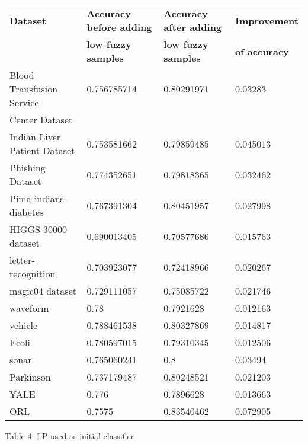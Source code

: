 \documentclass{article}
\begin{document}
		\begin{center}
			\textcolor{blue}{
				\begin{tabular}{l|l|l|l}
					\hline
					\textbf{Dataset} & \textbf{Accuracy before adding} & \textbf{Accuracy after adding} & \textbf{Improvement}\\
					& \textbf{low fuzzy samples} & \textbf{low fuzzy samples} & \textbf{of accuracy}\\
					\hline
					\hline
					Blood Transfusion Service & 0.756785714 & 0.80291971 & 0.03283 \\
					Center Dataset &  &  &  \\
					\hline
					Indian Liver Patient Dataset & 0.753581662 & 0.79859485 & 0.045013\\
					\hline
					Phishing Dataset & 0.774352651 & 0.79818365 & 0.032462\\
					\hline
					Pima-indians-diabetes & 0.767391304 & 0.80451957 & 0.027998\\
					\hline
					HIGGS-30000 dataset & 0.690013405 & 0.70577686 & 0.015763\\
					\hline
					letter-recognition & 0.703923077 & 0.72418966 & 0.020267\\
					\hline
					magic04 dataset & 0.729111057 & 0.75085722 & 0.021746\\
					\hline
					waveform & 0.78 & 0.7921628 & 0.012163\\
					\hline
					vehicle & 0.788461538 & 0.80327869 & 0.014817\\
					\hline
					Ecoli & 0.780597015 & 0.79310345 & 0.012506\\
					\hline
					sonar & 0.765060241 & 0.8 & 0.03494\\
					\hline
					Parkinson & 0.737179487  & 0.80248521 & 0.021203\\
					\hline
					YALE & 0.776 & 0.7896628 & 0.013663\\
					\hline
					ORL & 0.7575 & 0.83540462 & 0.072905\\
					\hline
				\end{tabular}
			}
		\end{center}
		
		\vspace{0.9em}
		 \begin{center}
			\small Table 4: LP used as initial classifier
		\end{center}
		
\end{document}
